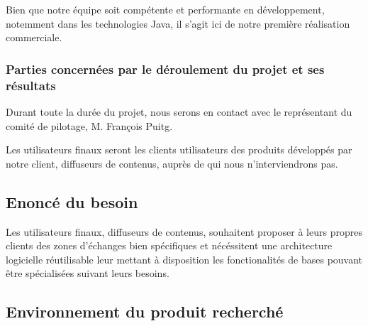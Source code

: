 Bien que notre équipe soit compétente et performante en développement, notemment dans les technologies Java, il s'agit ici de notre première réalisation commerciale.



\subsubsection{Parties concernées par le déroulement du projet et ses résultats}

Durant toute la durée du projet, nous serons en contact avec le représentant du comité de
pilotage, M. François Puitg.

Les utilisateurs finaux seront les clients utilisateurs des produits développés par notre client,
diffuseurs de contenus, auprès de qui nous n'interviendrons pas.

\subsection{Enoncé du besoin}
Les utilisateurs finaux, diffuseurs de contenus, souhaitent proposer à leurs propres clients
des zones d'échanges bien spécifiques et nécéssitent une architecture logicielle
réutilisable leur mettant à disposition les fonctionalités de bases pouvant être
spécialisées suivant leurs besoins.

\subsection{Environnement du produit recherché}

